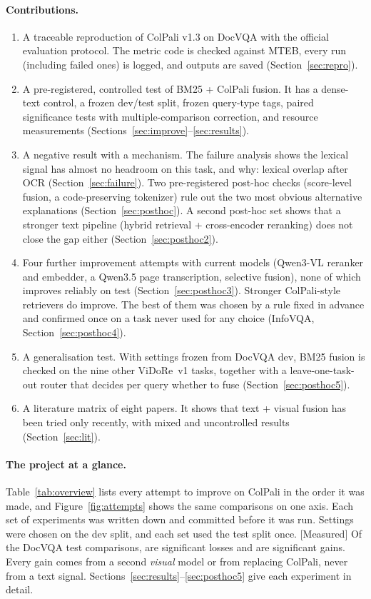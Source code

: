 \documentclass[11pt,a4paper]{article}
\newcommand{\lbl}[2]{\textsf{\scriptsize\textcolor{#1}{[#2]}}}
\newcommand{\Mea}{\lbl{tagM}{Measured}}
\begin{document}
\paragraph{Contributions.}
\begin{enumerate}
  \item A traceable reproduction of ColPali v1.3 on DocVQA with the official evaluation protocol. The metric code is checked against MTEB, every run (including failed ones) is logged, and outputs are saved (Section~\ref{sec:repro}).
  \item A pre-registered, controlled test of BM25 + ColPali fusion. It has a dense-text control, a frozen dev/test split, frozen query-type tags, paired significance tests with multiple-comparison correction, and resource measurements (Sections~\ref{sec:improve}--\ref{sec:results}).
  \item A negative result with a mechanism. The failure analysis shows the lexical signal has almost no headroom on this task, and why: lexical overlap after OCR (Section~\ref{sec:failure}). Two pre-registered post-hoc checks (score-level fusion, a code-preserving tokenizer) rule out the two most obvious alternative explanations (Section~\ref{sec:posthoc}). A second post-hoc set shows that a stronger text pipeline (hybrid retrieval + cross-encoder reranking) does not close the gap either (Section~\ref{sec:posthoc2}).
  \item Four further improvement attempts with current models (Qwen3-VL reranker and embedder, a Qwen3.5 page transcription, selective fusion), none of which improves reliably on test (Section~\ref{sec:posthoc3}). Stronger ColPali-style retrievers do improve. The best of them was chosen by a rule fixed in advance and confirmed once on a task never used for any choice (InfoVQA, Section~\ref{sec:posthoc4}).
  \item A generalisation test. With settings frozen from DocVQA dev, BM25 fusion is checked on the nine other ViDoRe~v1 tasks, together with a leave-one-task-out router that decides per query whether to fuse (Section~\ref{sec:posthoc5}).
  \item A literature matrix of eight papers. It shows that text + visual fusion has been tried only recently, with mixed and uncontrolled results (Section~\ref{sec:lit}).
\end{enumerate}

\paragraph{The project at a glance.}
Table~\ref{tab:overview} lists every attempt to improve on ColPali in the order it was made, and Figure~\ref{fig:attempts} shows the same comparisons on one axis. Each set of experiments was written down and committed before it was run. Settings were chosen on the dev split, and each set used the test split once. \Mea{} Of the \ovAttempts{} DocVQA test comparisons, \ovLosses{} are significant losses and \ovGains{} are significant gains. Every gain comes from a second \emph{visual} model or from replacing ColPali, never from a text signal. Sections~\ref{sec:results}--\ref{sec:posthoc5} give each experiment in detail.
\end{document}

